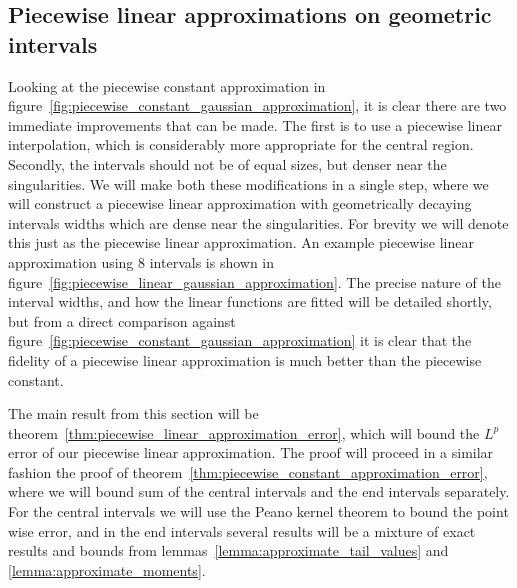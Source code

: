 \documentclass[manuscript,review]{acmart}
\begin{document}
\subsection{Piecewise linear approximations on geometric intervals}
\label{sec:piecewise_linear_approximations_on_geometric_intervals}

Looking at the piecewise constant approximation in figure~\ref{fig:piecewise_constant_gaussian_approximation}, it is clear there are two immediate improvements that can be made. The first is to use a piecewise linear interpolation, which is considerably more appropriate for the central region. Secondly, the intervals should not be of equal sizes, but denser near the singularities. We will make both these modifications in a single step, where we will construct a piecewise linear approximation with geometrically decaying intervals widths which are dense near the singularities. For brevity we will denote this just as the piecewise linear approximation. An example piecewise linear approximation using 8 intervals is shown in figure~\ref{fig:piecewise_linear_gaussian_approximation}. The precise nature of the interval widths, and how the linear functions are fitted will be detailed shortly, but from a direct comparison against figure~\ref{fig:piecewise_constant_gaussian_approximation} it is clear that the fidelity of a piecewise linear approximation is much better than the piecewise constant. 

The main result from this section will be theorem~\ref{thm:piecewise_linear_approximation_error}, which will bound the $ L^p $ error of our piecewise linear approximation. The proof will proceed in a similar fashion the proof of theorem~\ref{thm:piecewise_constant_approximation_error}, where we will bound sum of the central intervals and the end intervals separately. For the central intervals we will use the Peano kernel theorem to bound the point wise error, and in the end intervals several results will be a mixture of exact results and bounds from lemmas~\ref{lemma:approximate_tail_values} and \ref{lemma:approximate_moments}.
\end{document}
